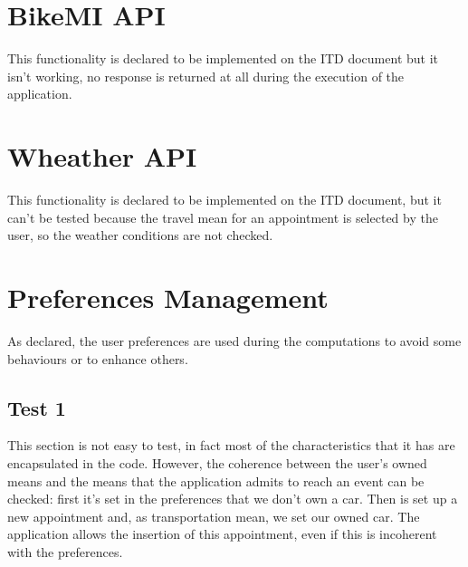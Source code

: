 
\section{BikeMI API}
This functionality is declared to be implemented on the ITD document but it isn't working, no response is returned at all during the execution of the application.

\section{Wheather API}
This functionality is declared to be implemented on the ITD document, but it can't be tested because the travel mean for an appointment is selected by the user, so the weather conditions are not checked.

\section{Preferences Management}
As declared, the user preferences are used during the computations to avoid some behaviours or to enhance others.

\subsection{Test 1}
This section is not easy to test, in fact most of the characteristics that it has are encapsulated in the code. However, the coherence between the user's owned means and the means that the application admits to reach an event can be checked: first it's set in the preferences that we don't own a car. Then is set up a new appointment and, as transportation mean, we set our owned car. The application allows the insertion of this appointment, even if this is incoherent with the preferences.


